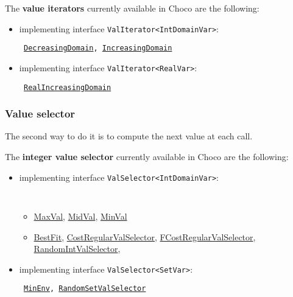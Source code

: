 \noindent The \textbf{value iterators} currently available in Choco are the following: 
\begin{itemize}
\item implementing interface \texttt{ValIterator<IntDomainVar>}:
\begin{notedef}\tt
\hyperlink{decreasingdomain:decreasingdomainvaliterator}{DecreasingDomain}, \hyperlink{increasingdomain:increasingdomainvaliterator}{IncreasingDomain}
\end{notedef}
\item implementing interface \texttt{ValIterator<RealVar>}:
\begin{notedef}\tt
\hyperlink{realincreasingdomain:realincreasingdomainvaliterator}{RealIncreasingDomain}
\end{notedef}
\end{itemize}

\subsubsection{Value selector}\label{solver:valueselector}\hypertarget{solver:valueselector}{}
The second way to do it is to compute the next value at each call.

\noindent The \textbf{integer value selector} currently available in Choco are the following: 
\begin{itemize}
\item implementing interface \texttt{ValSelector<IntDomainVar>}:
\begin{notedef}\tt
  \begin{itemize}
  \item \hyperlink{maxval:maxvalvalselector}{MaxVal}, \hyperlink{midval:midvalvalselector}{MidVal}, \hyperlink{minval:minvalvalselector}{MinVal}
  \item \hyperlink{bestfit:bestfitvalselector}{BestFit}, \hyperlink{costregularvalselector:costregularvalselectorvalselector}{CostRegularValSelector}, \hyperlink{fcostregularvalselector:fcostregularvalselectorvalselector}{FCostRegularValSelector}, \hyperlink{randomintvalselector:randomintvalselectorvalselector}{RandomIntValSelector}, %
  \end{itemize}
\end{notedef}
\item implementing interface \texttt{ValSelector<SetVar>}:
  \begin{notedef}\tt
\hyperlink{minenv:minenvvalselector}{MinEnv}, \hyperlink{randomsetvalselector:randomsetvalselectorvalselector}{RandomSetValSelector}
\end{notedef}
\end{itemize}


